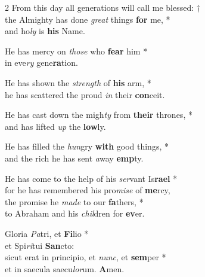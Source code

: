 

\begin{multicols}{2}
    \small
    From this day all generations will call me blessed: †\\
    the Almighty has done \emph{great} things \textbf{for} me, *\\
    and ho\emph{ly} is \textbf{his} Name.
    
    He has mercy on \emph{those} who \textbf{fear} him *\\
    in eve\emph{ry} gene\textbf{ra}tion.
    
    He has shown the \emph{strength} of \textbf{his} arm, *\\
    he has scattered the proud \emph{in} their \textbf{con}ceit.
    
    He has cast down the migh\emph{ty} from \textbf{their} thrones, *\\
    and has lifted \emph{up} the \textbf{low}ly.
    
    He has filled the \emph{hun}gry \textbf{with} good things, *\\
    and the rich he has sent \emph{a}way \textbf{emp}ty.
    
    He has come to the help of his \emph{ser}vant Is\textbf{rael} *\\
    for he has remembered his pro\emph{mise} of \textbf{me}rcy,\\
    the promise he \emph{made} to our \textbf{fa}thers, *\\
    to Abraham and his \emph{chil}dren for \textbf{ev}er.
    
    Gloria \emph{Pa}tri, et \textbf{Fi}lio *\\
    et Spi\emph{ri}tui \textbf{San}cto:\\
    sicut erat in principio, et \emph{nunc}, et \textbf{sem}per *\\
    et in saecula saecu\emph{lor}um. \textbf{A}men.
\end{multicols}
